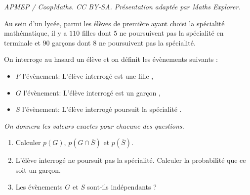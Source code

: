 \documentclass[10pt]{article}
\begin{document}
\noindent\textit{APMEP / CoopMaths. CC BY-SA. Présentation adaptée par Maths Explorer.}\par\medskip
\medskip

Au sein d'un lycée, parmi les élèves de première ayant choisi la spécialité mathématique, il y a $110$ filles dont $5$ ne poursuivent pas la spécialité en terminale et $90$ garçons dont $8$ ne poursuivent pas la spécialité.

On interroge au hasard un élève et on définit les évènements suivants :

\setlength\parindent{9mm}
\begin{itemize}[label=\textbullet]
\item $F$ l'évènement: \og L'élève interrogé est une fille \fg,
\item $G$ l'évènement: \og L'élève interrogé est un garçon \fg,
\item $S$ l'évènement: \og L'élève interrogé poursuit la spécialité \fg.
\end{itemize}
\setlength\parindent{0mm}

\emph{On donnera les valeurs exactes pour chacune des questions.}

\medskip

\begin{enumerate}
\item Calculer $p(G)$, $p\left(G \cap \overline{S}\right)$ et $p\left(\overline{S}\right)$.
\item L'élève interrogé ne poursuit pas la spécialité. Calculer la probabilité que ce soit
un garçon.
\item  Les évènements $G$ et $S$ sont-ils indépendants ?
\end{enumerate}

\bigskip
\end{document}
